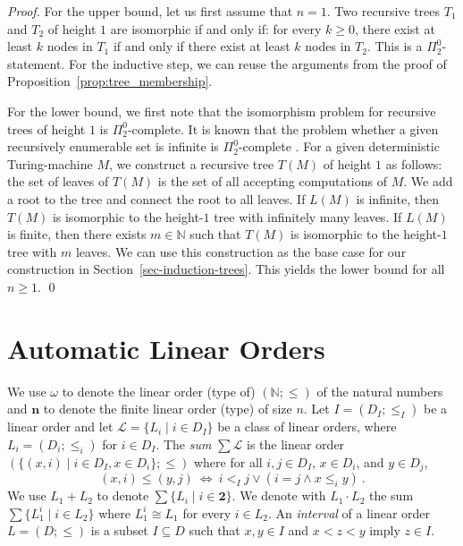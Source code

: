 \documentclass[envcountsame]{llncs}
\renewcommand{\L}{\mathcal L}
\newcommand{\N}{\mathbb N}
\renewcommand{\L}{\mathcal L}
\begin{document}
\begin{proof}
  For the upper bound, let us first assume that $n=1$.  Two recursive
  trees $T_1$ and $T_2$ of height $1$ are
  isomorphic if and only if: for every $k \geq 0$, there exist at
  least $k$ nodes in $T_1$ if and only if there exist at least $k$
  nodes in $T_2$. This is a $\Pi^0_2$-statement.  For the inductive
  step, we can reuse the arguments from the proof of
  Proposition~\ref{prop:tree_membership}.

  For the lower bound, we first note that the isomorphism problem for
  recursive trees of height $1$ is $\Pi^0_2$-complete. It is known
  that the problem whether a given recursively enumerable set is
  infinite is $\Pi^0_2$-complete \cite{Rogers}. For a given
  deterministic Turing-machine $M$, we construct a recursive tree
  $T(M)$ of height $1$ as follows: the set of leaves of $T(M)$ is the
  set of all accepting computations of $M$. We add a root to the tree
  and connect the root to all leaves. If $L(M)$ is infinite, then  
  $T(M)$ is isomorphic to the height-$1$ tree with infinitely many
  leaves. If $L(M)$ is finite, then there exists $m \in \N$ such that
  $T(M)$ is isomorphic to the height-$1$ tree with $m$ leaves.  We can
  use this construction as the base case for our construction in
  Section~\ref{sec-induction-trees}. This yields the lower bound for
  all $n \geq 1$.  \qed
\end{proof}


\section{Automatic Linear Orders} \label{sec-lin-order}

We use $\omega$ to denote the linear order (type of) $(\N;\leq)$ of the natural
numbers and $\mathbf{n}$ to denote the finite linear order (type) of
size $n$. Let $I = (D_I;\leq_I)$ be a linear order and let
$\L=\{L_i\mid i\in D_I\}$ be a class of linear orders, where
$L_i=(D_i;\leq_i)$ for $i\in D_I$. The {\em sum} $\sum \L$ is the
linear order $( \{ (x,i) \mid i\in D_I, x \in D_i\};\leq)$ where
for all $i,j\in D_I$, $x\in D_i$, and $y\in D_j$,
\[
    (x,i)\leq (y,j) \ \Longleftrightarrow \ i <_I j\vee (i=j \wedge x\leq_i y)\ .
\]
We use $L_1+L_2$ to denote $\sum \{L_i\mid i\in \mathbf{2}\}$. We denote with $L_1\cdot L_2$ 
the sum $\sum \{L^i_1\mid i\in L_2\}$ where $L^i_1\cong L_1$ for every $i\in L_2$. 
An {\em interval} of a linear order $L= (D;\leq)$ is a subset 
$I\subseteq D$ such that $x,y\in I$ and $x< z< y$ imply $z\in I$.
\end{document}
